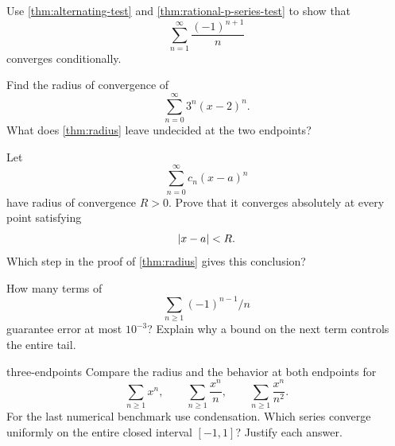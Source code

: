 \begin{exercise}
Use \cref{thm:alternating-test} and \cref{thm:rational-p-series-test} to show that
\[
\sum_{n=1}^{\infty}\frac{(-1)^{n+1}}{n}
\]
converges conditionally.
\end{exercise}

\begin{exercise}
Find the radius of convergence of
\[
\sum_{n=0}^{\infty}3^n(x-2)^n.
\]
What does \cref{thm:radius} leave undecided at the two endpoints?
\end{exercise}

\begin{exercise}
Let
\[
\sum_{n=0}^{\infty}c_n(x-a)^n
\]
have radius of convergence $R>0$. Prove that it converges absolutely at every point satisfying
\[
\lvert x-a\rvert<R.
\]
Which step in the proof of \cref{thm:radius} gives this conclusion?
\end{exercise}

\begin{exercise}
How many terms of
\[
\sum_{n\geq1}(-1)^{n-1}/n
\]
 guarantee error at most
$10^{-3}$? Explain why a bound on the next term controls the entire tail.
\end{exercise}
\begin{hexercise}{three-endpoints}
Compare the radius and the behavior at both endpoints for
\[
\sum_{n\geq1}x^n,\qquad
\sum_{n\geq1}\frac{x^n}{n},\qquad
\sum_{n\geq1}\frac{x^n}{n^2}.
\]
For the last numerical benchmark use condensation. Which series converge
uniformly on the entire closed interval $[-1,1]$? Justify each answer.
\end{hexercise}
